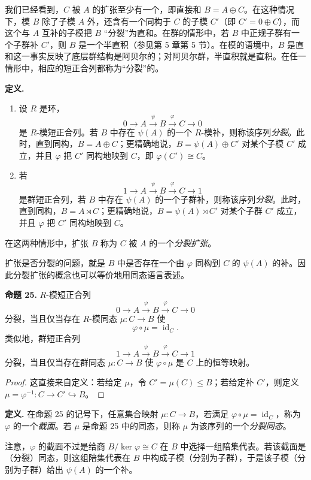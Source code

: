 我们已经看到，$C$ 被 $A$ 的扩张至少有一个，即直接和 $B=A\oplus C$。在这种情况下，模 $B$ 除了子模 $A$ 外，还含有一个同构于 $C$ 的子模 $C'$（即 $C'=0\oplus C$），而这个与 $A$ 互补的子模把 $B$ “分裂”为直和。在群的情形中，若 $B$ 中正规子群有一个子群补 $C'$，则 $B$ 是一个半直积（参见第 5 章第 5 节）。在模的语境中，$B$ 是直和这一事实反映了底层群结构是阿贝尔的；对阿贝尔群，半直积就是直积。在任一情形中，相应的短正合列都称为“分裂”的。

\noindent\textbf{定义.}
\begin{enumerate}[label=(\arabic*)]
\item 设 $R$ 是环，
\[
0\longrightarrow A\xrightarrow{\psi}B\xrightarrow{\varphi}C\longrightarrow0
\]
是 $R$-模短正合列。若 $B$ 中存在 $\psi(A)$ 的一个 $R$-模补，则称该序列\emph{分裂}。此时，直到同构，$B=A\oplus C$；更精确地说，$B=\psi(A)\oplus C'$ 对某个子模 $C'$ 成立，并且 $\varphi$ 把 $C'$ 同构地映到 $C$，即 $\varphi(C')\cong C$。
\item 若
\[
1\longrightarrow A\xrightarrow{\psi}B\xrightarrow{\varphi}C\longrightarrow1
\]
是群短正合列，若 $B$ 中存在 $\psi(A)$ 的一个子群补，则称该序列\emph{分裂}。此时，直到同构，$B=A\rtimes C$；更精确地说，$B=\psi(A)\rtimes C'$ 对某个子群 $C'$ 成立，并且 $\varphi$ 把 $C'$ 同构地映到 $C$。
\end{enumerate}
在这两种情形中，扩张 $B$ 称为 $C$ 被 $A$ 的一个\emph{分裂扩张}。

扩张是否分裂的问题，就是 $B$ 中是否存在一个由 $\varphi$ 同构到 $C$ 的 $\psi(A)$ 的补。因此分裂扩张的概念也可以等价地用同态语言表述。

\noindent\textbf{命题 25.} $R$-模短正合列
\[
0\longrightarrow A\xrightarrow{\psi}B\xrightarrow{\varphi}C\longrightarrow0
\]
分裂，当且仅当存在 $R$-模同态 $\mu:C\to B$ 使
\[
\varphi\circ\mu=\operatorname{id}_C.
\]
类似地，群短正合列
\[
1\longrightarrow A\xrightarrow{\psi}B\xrightarrow{\varphi}C\longrightarrow1
\]
分裂，当且仅当存在群同态 $\mu:C\to B$ 使 $\varphi\circ\mu$ 是 $C$ 上的恒等映射。

\begin{proof}
这直接来自定义：若给定 $\mu$，令 $C'=\mu(C)\leq B$；若给定补 $C'$，则定义 $\mu=\varphi^{-1}:C\to C'\hookrightarrow B$。
\end{proof}

\noindent\textbf{定义.} 在命题 25 的记号下，任意集合映射 $\mu:C\to B$，若满足 $\varphi\circ\mu=\operatorname{id}_C$，称为 $\varphi$ 的一个\emph{截面}。若 $\mu$ 是命题 25 中的同态，则称 $\mu$ 为该序列的一个\emph{分裂同态}。

注意，$\varphi$ 的截面不过是给商 $B/\ker\varphi\cong C$ 在 $B$ 中选择一组陪集代表。若该截面是（分裂）同态，则这组陪集代表在 $B$ 中构成子模（分别为子群），于是该子模（分别为子群）给出 $\psi(A)$ 的一个补。

